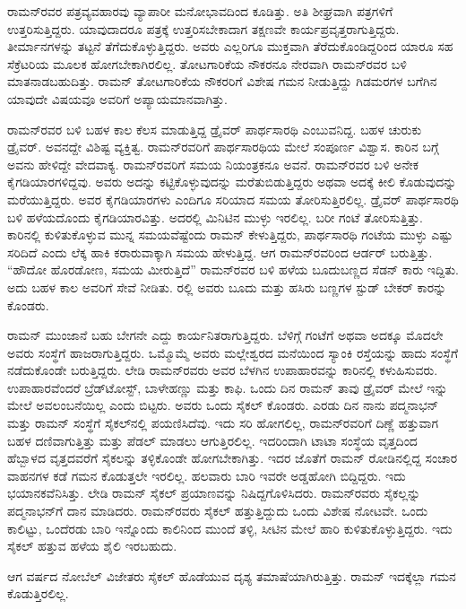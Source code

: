 ರಾಮನ್‍ರವರ ಪತ್ರವ್ಯವಹಾರವು ವ್ಯಾಪಾರೀ ಮನೋಭಾವದಿಂದ ಕೂಡಿತ್ತು. ಅತಿ ಶೀಘ್ರವಾಗಿ ಪತ್ರಗಳಿಗೆ ಉತ್ತರಿಸುತ್ತಿದ್ದರು. ಯಾವುದಾದರೂ ಪತ್ರಕ್ಕೆ ಉತ್ತರಿಸಬೇಕಾದಾಗ ತಕ್ಷಣವೇ ಕಾರ್ಯಪ್ರವೃತ್ತರಾಗುತ್ತಿದ್ದರು. ತೀರ್ಮಾನಗಳನ್ನು ತಟ್ಟನೆ ತೆಗೆದುಕೊಳ್ಳುತ್ತಿದ್ದರು. ಅವರು ಎಲ್ಲರಿಗೂ ಮುಕ್ತವಾಗಿ ತೆರೆದುಕೊಂಡಿದ್ದರಿಂದ ಯಾರೂ ಸಹ ಸೆಕ್ರೆಟರಿಯ ಮೂಲಕ ಹೋಗಬೇಕಾಗಿರಲಿಲ್ಲ. ತೋಟಗಾರಿಕೆಯ ನೌಕರನೂ ನೇರವಾಗಿ ರಾಮನ್‍ರವರ ಬಳಿ ಮಾತನಾಡಬಹುದಿತ್ತು. ರಾಮನ್ ತೋಟಗಾರಿಕೆಯ ನೌಕರರಿಗೆ ವಿಶೇಷ ಗಮನ ನೀಡುತ್ತಿದ್ದು ಗಿಡಮರಗಳ ಬಗೆಗಿನ ಯಾವುದೇ ವಿಷಯವೂ ಅವರಿಗೆ ಅಪ್ಯಾಯಮಾನವಾಗಿತ್ತು.

ರಾಮನ್‍ರವರ ಬಳಿ ಬಹಳ ಕಾಲ ಕೆಲಸ ಮಾಡುತ್ತಿದ್ದ ಡ್ರೈವರ್ ಪಾರ್ಥಸಾರಥಿ ಎಂಬುವನಿದ್ದ. ಬಹಳ ಚುರುಕು ಡ್ರೈವರ್. ಅವನದ್ದೇ ವಿಶಿಷ್ಟ ವ್ಯಕ್ತಿತ್ವ. ರಾಮನ್‍ರವರಿಗೆ ಪಾರ್ಥಸಾರಥಿಯ ಮೇಲೆ ಸಂಪೂರ್ಣ ವಿಶ್ವಾಸ. ಕಾರಿನ ಬಗ್ಗೆ ಅವನು ಹೇಳಿದ್ದೇ ವೇದವಾಕ್ಯ. ರಾಮನ್‍ರವರಿಗೆ ಸಮಯ ನಿಯಂತ್ರಕನೂ ಅವನೆ. ರಾಮನ್‍ರವರ ಬಳಿ ಅನೇಕ ಕೈಗಡಿಯಾರಗಳಿದ್ದವು. ಅವರು ಅದನ್ನು ಕಟ್ಟಿಕೊಳ್ಳುವುದನ್ನು ಮರೆತುಬಿಡುತ್ತಿದ್ದರು ಅಥವಾ ಅದಕ್ಕೆ ಕೀಲಿ ಕೊಡುವುದನ್ನು ಮರೆಯುತ್ತಿದ್ದರು. ಅವರ ಕೈಗಡಿಯಾರಗಳು ಎಂದಿಗೂ ಸರಿಯಾದ ಸಮಯ ತೋರಿಸುತ್ತಿರಲಿಲ್ಲ. ಡ್ರೈವರ್ ಪಾರ್ಥಸಾರಥಿ ಬಳಿ ಹಳೆಯದೊಂದು ಕೈಗಡಿಯಾರವಿತ್ತು. ಅದರಲ್ಲಿ ಮಿನಿಟಿನ ಮುಳ್ಳು ಇರಲಿಲ್ಲ. ಬರೀ ಗಂಟೆ ತೋರಿಸುತ್ತಿತ್ತು. ಕಾರಿನಲ್ಲಿ ಕುಳಿತುಕೊಳ್ಳುವ ಮುನ್ನ ಸಮಯವೆಷ್ಟೆಂದು ರಾಮನ್ ಕೇಳುತ್ತಿದ್ದರು, ಪಾರ್ಥಸಾರಥಿ ಗಂಟೆಯ ಮುಳ್ಳು ಎಷ್ಟು ಸರಿದಿದೆ ಎಂದು ಲೆಕ್ಕ ಹಾಕಿ ಕರಾರುವಾಕ್ಕಾಗಿ ಸಮಯ ಹೇಳುತ್ತಿದ್ದ. ಆಗ ರಾಮನ್‍ರವರಿಂದ ಆರ್ಡರ್ ಬರುತ್ತಿತ್ತು. “ಹೌದೋ ಹೊರಡೋಣ, ಸಮಯ ಮೀರುತ್ತಿದೆ” ರಾಮನ್‍ರವರ ಬಳಿ ಹಳೆಯ ಬೂದುಬಣ್ಣದ ಸೆಡನ್ ಕಾರು ಇದ್ದಿತು. ಅದು ಬಹಳ ಕಾಲ ಅವರಿಗೆ ಸೇವೆ ನೀಡಿತು. ರಲ್ಲಿ ಅವರು ಬೂದು ಮತ್ತು ಹಸಿರು ಬಣ್ಣಗಳ ಸ್ಟುಡ್ ಬೇಕರ್ ಕಾರನ್ನು ಕೊಂಡರು.

ರಾಮನ್ ಮುಂಜಾನೆ ಬಹು ಬೇಗನೇ ಎದ್ದು ಕಾರ್ಯನಿತರಾಗುತ್ತಿದ್ದರು. ಬೆಳಿಗ್ಗೆ  ಗಂಟೆಗೆ ಅಥವಾ ಅದಕ್ಕೂ ಮೊದಲೇ ಅವರು ಸಂಸ್ಥೆಗೆ ಹಾಜರಾಗುತ್ತಿದ್ದರು. ಒಮ್ಮೊಮ್ಮೆ ಅವರು ಮಲ್ಲೇಶ್ವರದ ಮನೆಯಿಂದ ಸ್ಯಾಂಕಿ ರಸ್ತೆಯನ್ನು ಹಾದು ಸಂಸ್ಥೆಗೆ ನಡೆದುಕೊಂಡೇ ಬರುತ್ತಿದ್ದರು. ಲೇಡಿ ರಾಮನ್‍ರವರು ಅವರ ಬೆಳಗಿನ ಉಪಾಹಾರವನ್ನು ಕಾರಿನಲ್ಲಿ ಕಳುಹಿಸುವರು. ಉಪಾಹಾರವೆಂದರೆ ಬ್ರೆಡ್‍ಟೋಸ್ಟ್, ಬಾಳೇಹಣ್ಣು ಮತ್ತು ಕಾಫಿ. ಒಂದು ದಿನ ರಾಮನ್ ತಾವು ಡ್ರೈವರ್ ಮೇಲೆ ಇನ್ನು ಮೇಲೆ ಅವಲಂಬನೆಯಿಲ್ಲ ಎಂದು ಬಿಟ್ಟರು. ಅವರು ಒಂದು ಸೈಕಲ್ ಕೊಂಡರು. ಎರಡು ದಿನ ನಾನು ಪದ್ಮನಾಭನ್ ಮತ್ತು ರಾಮನ್ ಸಂಸ್ಥೆಗೆ ಸೈಕಲ್‍ನಲ್ಲಿ ಪಯಣಿಸಿದೆವು. ಇದು ಸರಿ ಹೋಗಲಿಲ್ಲ, ರಾಮನ್‍ರವರಿಗೆ ದಿಣ್ಣೆ ಹತ್ತುವಾಗ ಬಹಳ ದಣಿವಾಗುತ್ತಿತ್ತು ಮತ್ತು ಪೆಡಲ್ ಮಾಡಲು ಆಗುತ್ತಿರಲಿಲ್ಲ. ಇದರಿಂದಾಗಿ ಟಾಟಾ ಸಂಸ್ಥೆಯ ವೃತ್ತದಿಂದ ಹೆಬ್ಬಾಳದ ವೃತ್ತದವರೆಗೆ ಸೈಕಲನ್ನು ತಳ್ಳಿಕೊಂಡೇ ಹೋಗಬೇಕಾಗಿತ್ತು. ಇದರ ಜೊತೆಗೆ ರಾಮನ್ ರೋಡಿನಲ್ಲಿದ್ದ ಸಂಚಾರ ವಾಹನಗಳ ಕಡೆ ಗಮನ ಕೊಡುತ್ತಲೇ ಇರಲಿಲ್ಲ. ಹಲವಾರು ಬಾರಿ ಇವರೇ ಅಡ್ಡಹೋಗಿ ಬಿದ್ದಿದ್ದರು. ಇದು ಭಯಾನಕವೆನಿಸಿತ್ತು. ಲೇಡಿ ರಾಮನ್ ಸೈಕಲ್ ಪ್ರಯಾಣವನ್ನು ನಿಷಿದ್ದಗೊಳಿಸಿದರು. ರಾಮನ್‍ರವರು ಸೈಕಲ್ಲನ್ನು ಪದ್ಮನಾಭನ್‍ಗೆ ದಾನ ಮಾಡಿದರು. ರಾಮನ್‍ರವರು ಸೈಕಲ್ ಹತ್ತುತ್ತಿದ್ದುದು ಒಂದು ವಿಶೇಷ ನೋಟವೇ. ಒಂದು ಕಾಲಿಟ್ಟು, ಒಂದೆರಡು ಬಾರಿ ಇನ್ನೊಂದು ಕಾಲಿನಿಂದ ಮುಂದೆ ತಳ್ಳಿ, ಸೀಟಿನ ಮೇಲೆ ಹಾರಿ ಕುಳಿತುಕೊಳ್ಳುತ್ತಿದ್ದರು. ಇದು ಸೈಕಲ್ ಹತ್ತುವ ಹಳೆಯ ಶೈಲಿ ಇರಬಹುದು.

ಆಗ  ವರ್ಷದ ನೋಬೆಲ್ ವಿಜೇತರು ಸೈಕಲ್ ಹೊಡೆಯುವ ದೃಶ್ಯ ತಮಾಷೆಯಾಗಿರುತ್ತಿತ್ತು. ರಾಮನ್ ಇದಕ್ಕೆಲ್ಲಾ ಗಮನ ಕೊಡುತ್ತಿರಲಿಲ್ಲ.

